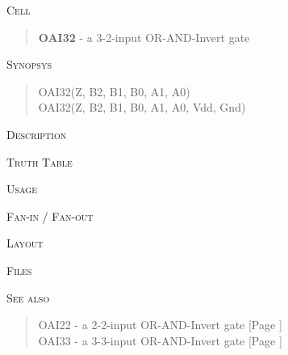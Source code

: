 
\label{OAI32}
\textsc{Cell}
\begin{quote}
    \textbf{OAI32} - a 3-2-input OR-AND-Invert gate
\end{quote}

\textsc{Synopsys}
\begin{quote}
    OAI32(Z, B2, B1, B0, A1, A0) \\
    OAI32(Z, B2, B1, B0, A1, A0, Vdd, Gnd)
\end{quote}

\textsc{Description}

%

\textsc{Truth Table}


\textsc{Usage}

\textsc{Fan-in / Fan-out}

\textsc{Layout}

\textsc{Files}

\textsc{See also}
\begin{quote}
    OAI22 - a 2-2-input OR-AND-Invert gate [Page \pageref{OAI22}] \\
    OAI33 - a 3-3-input OR-AND-Invert gate [Page \pageref{OAI33}]
\end{quote}
